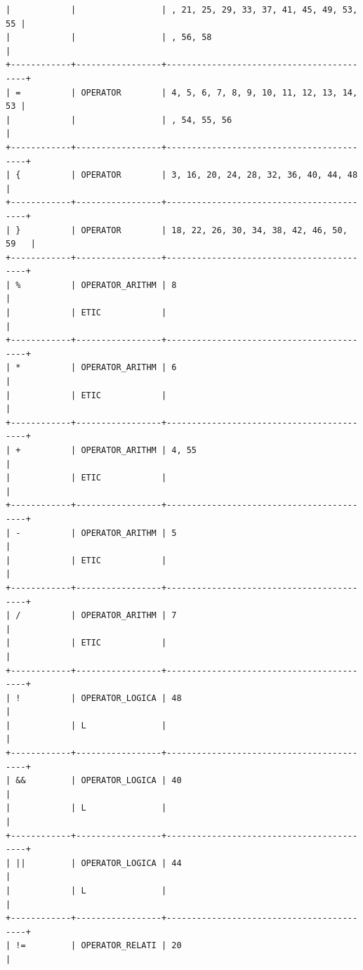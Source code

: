 \documentclass[a4paper,12pt]{article}
\begin{document}
\begin{flushleft}
\begin{verbatim}
|            |                 | , 21, 25, 29, 33, 37, 41, 45, 49, 53, 55 |
|            |                 | , 56, 58                                 |
+------------+-----------------+------------------------------------------+
| =          | OPERATOR        | 4, 5, 6, 7, 8, 9, 10, 11, 12, 13, 14, 53 |
|            |                 | , 54, 55, 56                             |
+------------+-----------------+------------------------------------------+
| {          | OPERATOR        | 3, 16, 20, 24, 28, 32, 36, 40, 44, 48    |
+------------+-----------------+------------------------------------------+
| }          | OPERATOR        | 18, 22, 26, 30, 34, 38, 42, 46, 50, 59   |
+------------+-----------------+------------------------------------------+
| %          | OPERATOR_ARITHM | 8                                        |
|            | ETIC            |                                          |
+------------+-----------------+------------------------------------------+
| *          | OPERATOR_ARITHM | 6                                        |
|            | ETIC            |                                          |
+------------+-----------------+------------------------------------------+
| +          | OPERATOR_ARITHM | 4, 55                                    |
|            | ETIC            |                                          |
+------------+-----------------+------------------------------------------+
| -          | OPERATOR_ARITHM | 5                                        |
|            | ETIC            |                                          |
+------------+-----------------+------------------------------------------+
| /          | OPERATOR_ARITHM | 7                                        |
|            | ETIC            |                                          |
+------------+-----------------+------------------------------------------+
| !          | OPERATOR_LOGICA | 48                                       |
|            | L               |                                          |
+------------+-----------------+------------------------------------------+
| &&         | OPERATOR_LOGICA | 40                                       |
|            | L               |                                          |
+------------+-----------------+------------------------------------------+
| ||         | OPERATOR_LOGICA | 44                                       |
|            | L               |                                          |
+------------+-----------------+------------------------------------------+
| !=         | OPERATOR_RELATI | 20                                       |

\end{verbatim}
\end{flushleft}
\end{document}
